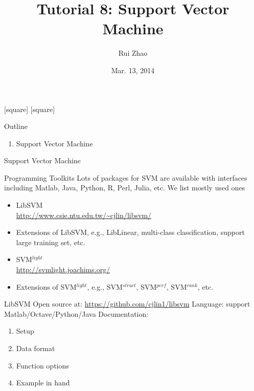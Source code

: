 \documentclass[compress,blue]{beamer}
\title[ENGG 5202 Pattern Recognition Tutorial 4]{Tutorial 8: Support Vector Machine}
\author{Rui Zhao}
\institute{rzhao@ee.cuhk.edu.hk}
\date{Mar. 13, 2014}
\begin{document}
\begin{frame}
\titlepage
\end{frame}

[square]
[square]

\begin{frame}{Outline}
	\begin{enumerate}
		\item Support Vector Machine
	\end{enumerate}
\end{frame}


\begin{frame}{Support Vector Machine}
	\begin{block}{Programming Toolkits}
		Lots of packages for SVM are available with interfaces including Matlab, Java, Python, R, Perl, Julia, etc. We list mostly used ones
		\begin{itemize}
			\item LibSVM \\
			\url{http://www.csie.ntu.edu.tw/~cjlin/libsvm/}
			\item Extensions of LibSVM, e.g., LibLinear, multi-class classification, support large training set, etc. 
			\item SVM$^{light}$ \\
			\url{http://svmlight.joachims.org/}
			\item Extensions of SVM$^{light}$, e.g., SVM$^{struct}$, SVM$^{perf}$, SVM$^{rank}$, etc.
		\end{itemize}
	\end{block}
\end{frame}

\begin{frame}{LibSVM}
Open source at: \url{https://github.com/cjlin1/libsvm}
Language: support Matlab/Octave/Python/Java
Documentation:
\begin{enumerate}
	\item Setup
	\item Data format
	\item Function options 
	\item Example in hand
\end{enumerate}
\end{frame}
\end{document}

